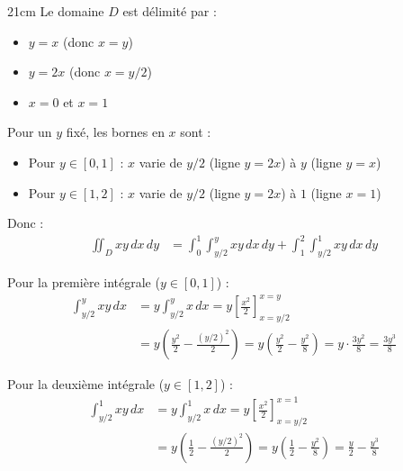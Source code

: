 \begin{parts}
\begin{solutionbox}{21cm}
        Le domaine $D$ est délimité par :
        \begin{itemize}
            \item $y = x$ (donc $x = y$)
            \item $y = 2x$ (donc $x = y/2$)
            \item $x = 0$ et $x = 1$
        \end{itemize}
        
        Pour un $y$ fixé, les bornes en $x$ sont :
        \begin{itemize}
            \item Pour $y \in [0, 1]$ : $x$ varie de $y/2$ (ligne $y = 2x$) à $y$ (ligne $y = x$)
            \item Pour $y \in [1, 2]$ : $x$ varie de $y/2$ (ligne $y = 2x$) à $1$ (ligne $x = 1$)
        \end{itemize}
        
        Donc :
        \begin{align*}
            \iint_D xy \, dx \, dy &= \int_0^1 \int_{y/2}^y xy \, dx \, dy + \int_1^2 \int_{y/2}^1 xy \, dx \, dy
        \end{align*}
        
        Pour la première intégrale ($y \in [0, 1]$) :
        \begin{align*}
            \int_{y/2}^y xy \, dx &= y \int_{y/2}^y x \, dx
            = y \left[ \frac{x^2}{2} \right]_{x=y/2}^{x=y}\\
            &= y \left( \frac{y^2}{2} - \frac{(y/2)^2}{2} \right)
            = y \left( \frac{y^2}{2} - \frac{y^2}{8} \right)
            = y \cdot \frac{3y^2}{8}
            = \frac{3y^3}{8}
        \end{align*}
        
        Pour la deuxième intégrale ($y \in [1, 2]$) :
        \begin{align*}
            \int_{y/2}^1 xy \, dx &= y \int_{y/2}^1 x \, dx
            = y \left[ \frac{x^2}{2} \right]_{x=y/2}^{x=1}\\
            &= y \left( \frac{1}{2} - \frac{(y/2)^2}{2} \right)
            = y \left( \frac{1}{2} - \frac{y^2}{8} \right)
            = \frac{y}{2} - \frac{y^3}{8}
        \end{align*}
        

\end{solutionbox}
\end{parts}
